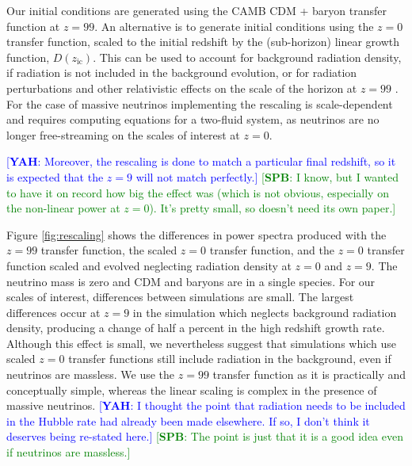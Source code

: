 \documentclass[useAMS, usenatbib]{mnras}
\newcommand{\spb}[1]{{\textcolor{green}{[{\bf SPB}: #1]}}}
\newcommand{\yah}[1]{{\textcolor{blue}{[{\bf YAH}: #1]}}}
\begin{document}
Our initial conditions are generated using the CAMB CDM + baryon transfer
function at $z=99$. An alternative is to generate initial conditions
using the $z=0$ transfer function, scaled to the initial redshift by the
(sub-horizon) linear growth function, $D(z_\mathrm{ic})$. This can
be used to account for background radiation density, if radiation is not included
in the background evolution, or for radiation perturbations and other relativistic
effects on the scale of the horizon at $z=99$ \citep{Zennaro_2017}. For the case of massive neutrinos implementing the rescaling is scale-dependent and requires computing equations for a two-fluid system, as neutrinos are no longer free-streaming on the scales of interest at $z=0$.

\yah{Moreover, the rescaling is done to match a particular final redshift, so it is expected that the $z = 9$ will not match perfectly.} \spb{I know, but I wanted to have it on record how big the effect was (which is not obvious, especially on the non-linear power at $z=0$). It's pretty small, so doesn't need its own paper.}

Figure \ref{fig:rescaling} shows the differences in power spectra
produced with the $z=99$ transfer function, the
scaled $z=0$ transfer function, and the $z=0$ transfer function
scaled and evolved neglecting radiation density at $z=0$ and $z=9$.
The neutrino mass is zero and CDM and baryons are in a single species.
For our scales of interest, differences between simulations are small.
The largest differences occur at $z=9$ in the simulation which neglects
background radiation density, producing a change of half a percent in
the high redshift growth rate. Although this effect is small, we nevertheless suggest that simulations
which use scaled $z=0$ transfer functions still include radiation in the background, even if neutrinos are massless. We use the $z=99$ transfer function as it is practically and conceptually simple,
whereas the linear scaling is complex in the presence of massive neutrinos.
\yah{I thought the point that radiation needs to be included in the Hubble rate had already been made elsewhere. If so, I don't think it deserves being re-stated here.} \spb{The point is just that it is a good idea even if neutrinos are massless.}


\label{lastpage}


\end{document}
